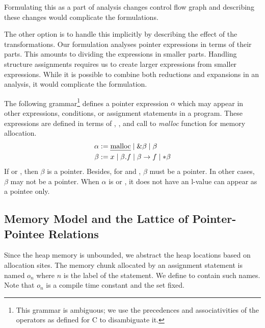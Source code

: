 \documentclass[a4paper,11pt,fleqn]{article}
\newcommand{\var}{\text{\sf\em V\/}\xspace}
\newcommand{\pointer}{\text{\sf\em P\/}\xspace}
\begin{document}
\begin{itemize}
      Formulating this as a part of analysis changes control flow graph
      and describing these changes would complicate the formulations.

      The other option is to handle this implicitly by describing the
      effect of the transformations. Our formulation analyses pointer
      expressions in terms of their parts. This amounts to dividing
      the expressions in smaller parts. Handling structure assignments
      requires us to create larger expressions from smaller expressions.
      While it is possible to combine both reductions and expansions in
      an analysis, it would complicate the formulation.
      
\end{itemize}

The following grammar\footnote{This grammar is ambiguous; we use the
precedences and associativities of the operators as defined for C to
disambiguate it.} defines a pointer expression $\alpha$ 
which may appear in other expressions, conditions,
or assignment statements in a program. These expressions are defined
in terms of \text{$x \in \var$}, , and
call to {\em malloc\/} function for memory allocation.
\begin{align}
\alpha & :=
	\text{\em malloc\/}
	\mid \&\beta
	\mid \beta
	\\
\beta & :=  x 
       \mid \beta.f 
       \mid \beta\rightarrow f 
       \mid *\beta  
\end{align}
If  or \text{$x \in \pointer$}, then $\beta$ is a
pointer. Besides, for  and \text{$ *\beta
$}, $\beta$ must be a pointer. In other cases, $\beta$ may not be a
pointer. When $\alpha$ is  or \text{$\&\beta$}, it
does not have an l-value can appear as a pointee only.

\subsection{Memory Model and the Lattice of Pointer-Pointee Relations}

Since the heap memory is unbounded, we abstract the heap locations based
on allocation sites. The memory chunk allocated by an
assignment statement  is named $o_n$ where $n$ is the
label of the statement. We define \heap to contain such names. Note that $o_n$ is a compile time constant
and the set \heap fixed.

\newcommand{\structp}{\text{\sf\em S$_{p}$}\xspace}
\newcommand{\structm}{\text{\sf\em S$_{m}$}\xspace}
\newcommand{\genp}{\text{\sf\em G$_{p}$}\xspace}
\newcommand{\genm}{\text{\sf\em G$_{m}$}\xspace}
\newcommand{\rootp}{\text{\sf\em R\/}\xspace}
\newcommand{\source}{\text{\sf\em S\/}\xspace}
\newcommand{\target}{\text{\sf\em T\/}\xspace}
\newcommand{\inner}{\text{\sf\em inner\_level\/}\xspace}
\newcommand{\sibling}{\text{\sf\em same\_level\/}\xspace}
\newcommand{\coincides}{\text{\sf\em coincides\/}\xspace}
\end{document}
